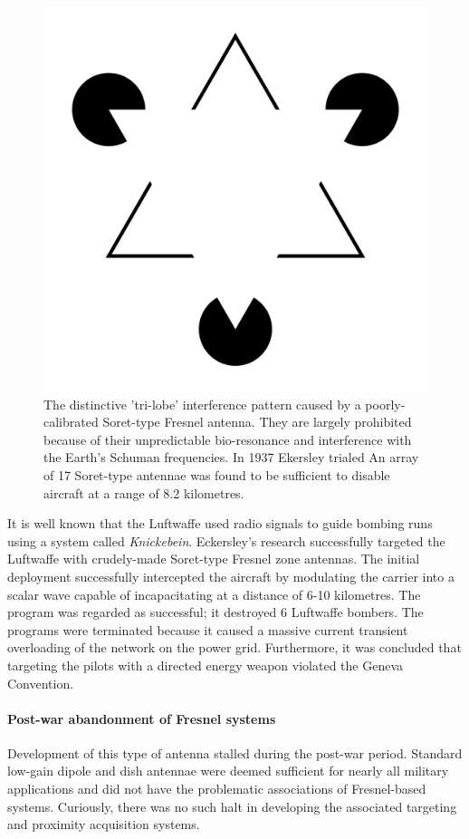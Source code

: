 \documentclass[review]{elsarticle}
\begin{document}
\begin{figure}
    \centering
    \includegraphics[width=0.5\linewidth]{1920px-Kanizsa_triangle.svg.png}
    \caption{The distinctive 'tri-lobe' interference pattern caused by a poorly-calibrated Soret-type Fresnel antenna. They are largely prohibited because of their unpredictable bio-resonance and interference with the Earth's Schuman frequencies. In 1937 Ekersley trialed An array of 17 Soret-type antennae was found to be sufficient to disable aircraft at a range of 8.2 kilometres.}
    \label{fig:enter-label}
\end{figure}

It is well known that the Luftwaffe used radio signals to guide bombing runs using a system called \textit{Knickebein}.  Eckersley's research successfully targeted the Luftwaffe with crudely-made Soret-type Fresnel zone antennas. The initial deployment successfully intercepted the aircraft by modulating the carrier into a scalar wave capable of incapacitating at a distance of 6-10 kilometres. The program was regarded as successful; it destroyed 6 Luftwaffe bombers.  The programs were terminated because it caused a massive current transient overloading of the network on the power grid. Furthermore, it was concluded that targeting the pilots with a directed energy weapon violated the Geneva Convention.

\paragraph{Post-war abandonment of Fresnel systems} Development of this type of antenna stalled during the post-war period. Standard low-gain dipole and dish antennae were deemed sufficient for nearly all military applications and did not have the problematic associations of Fresnel-based systems. Curiously, there was no such halt in developing the associated targeting and proximity acquisition systems. 
\end{document}
